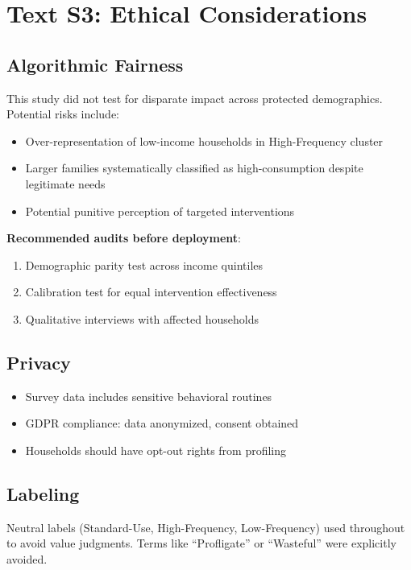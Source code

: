 \documentclass[a4paper,12pt]{article}
\begin{document}
\section{Text S3: Ethical Considerations}

\subsection{Algorithmic Fairness}
This study did not test for disparate impact across protected demographics. Potential risks include:
\begin{itemize}
    \item Over-representation of low-income households in High-Frequency cluster
    \item Larger families systematically classified as high-consumption despite legitimate needs
    \item Potential punitive perception of targeted interventions
\end{itemize}

\textbf{Recommended audits before deployment}:
\begin{enumerate}
    \item Demographic parity test across income quintiles
    \item Calibration test for equal intervention effectiveness
    \item Qualitative interviews with affected households
\end{enumerate}

\subsection{Privacy}
\begin{itemize}
    \item Survey data includes sensitive behavioral routines
    \item GDPR compliance: data anonymized, consent obtained
    \item Households should have opt-out rights from profiling
\end{itemize}

\subsection{Labeling}
Neutral labels (Standard-Use, High-Frequency, Low-Frequency) used throughout to avoid value judgments. Terms like ``Profligate'' or ``Wasteful'' were explicitly avoided.
\end{document}
